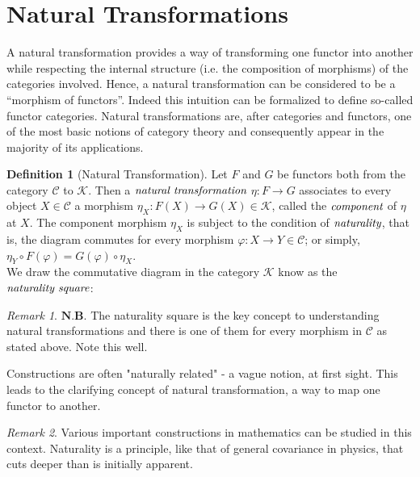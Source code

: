 \documentclass[10pt, oneside, reqno]{amsart}
\theoremstyle{plain}%
\theoremstyle{definition}
\newtheorem{defn}[thm]{Definition}
\theoremstyle{remark}
\newtheorem*{rem}{Remark}
\begin{document}
\section{Natural Transformations} %
\label{sec:natural transformations}
A natural transformation provides a way of transforming one functor into another
while respecting the internal structure (i.e. the composition of morphisms) of the categories involved.
Hence, a natural transformation can be considered to be a ``morphism of functors''.
Indeed this intuition can be formalized to define so-called functor categories.
Natural transformations are, after categories and functors, one of the most basic notions of category theory
and consequently appear in the majority of its applications.

\begin{defn}[Natural Transformation]
 Let $F$ and $G$ be functors both from the category $\mathcal{C}$ to $\mathcal{K}$.
 Then a $\emph{natural transformation}$ $\eta : F \to G$ associates to every object
 $X \in \mathcal{C}$ a morphism $\eta_{X} : F(X) \to G(X) \in \mathcal{K}$, called the $\emph{component}$
 of $\eta$ at $X$. The component morphism $\eta_{X}$ is subject to the condition of $\emph{naturality}$,
 that is, the diagram commutes for every morphism $\varphi: X \to Y \in \mathcal{C}$; or simply,
 $\eta_{Y} \circ F(\varphi) = G(\varphi) \circ \eta_{X}$.
 \\
 We draw the commutative diagram in the category $\mathcal{K}$ know as the $\emph{naturality square}$:
\end{defn}
\begin{rem}
 $\textbf{N.B.}$ The naturality square is the key concept to understanding natural transformations and
 there is one of them for every morphism in $\mathcal{C}$ as stated above. Note this well.
\end{rem}

Constructions are often "naturally related" - a vague notion, at first sight.
This leads to the clarifying concept of natural transformation, a way to map one functor to another.
\begin{rem}
 Various important constructions in mathematics can be studied in this context.
 Naturality is a principle, like that of general covariance in physics, that cuts deeper than is initially apparent.
\end{rem}
\end{document}
